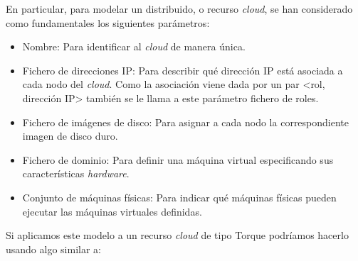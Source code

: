 

En particular, para modelar un distribuido, o recurso \emph{cloud}, se han considerado como fundamentales los siguientes parámetros:

\begin{itemize}
\item Nombre: Para identificar al \emph{cloud} de manera única.
\item Fichero de direcciones IP: Para describir qué dirección IP está asociada a cada nodo del \emph{cloud}. Como la asociación viene dada por un par <rol, dirección IP> también se le llama a este parámetro fichero de roles.
\item Fichero de imágenes de disco: Para asignar a cada nodo la correspondiente imagen de disco duro.
\item Fichero de dominio: Para definir una máquina virtual especificando sus características \emph{hardware}.
\item Conjunto de máquinas físicas: Para indicar qué máquinas físicas pueden ejecutar las máquinas virtuales definidas.
\end{itemize}

Si aplicamos este modelo a un recurso \emph{cloud} de tipo Torque podríamos hacerlo usando algo similar a:

